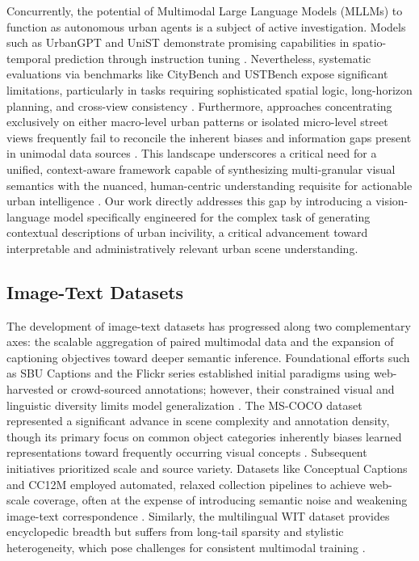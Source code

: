 \documentclass[lettersize,journal]{IEEEtran}
\begin{document}
	Concurrently, the potential of Multimodal Large Language Models (MLLMs) to function as autonomous urban agents is a subject of active investigation. Models such as UrbanGPT and UniST demonstrate promising capabilities in spatio-temporal prediction through instruction tuning \cite{li2024urbangpt, yuan2024unist}. Nevertheless, systematic evaluations via benchmarks like CityBench and USTBench expose significant limitations, particularly in tasks requiring sophisticated spatial logic, long-horizon planning, and cross-view consistency \cite{feng2024citybench, lai2025ustbench, zhou2025urbench}. Furthermore, approaches concentrating exclusively on either macro-level urban patterns or isolated micro-level street views frequently fail to reconcile the inherent biases and information gaps present in unimodal data sources \cite{chen2024profiling, hao2025urbanvlp}. This landscape underscores a critical need for a unified, context-aware framework capable of synthesizing multi-granular visual semantics with the nuanced, human-centric understanding requisite for actionable urban intelligence \cite{he2025urbanfeel}. Our work directly addresses this gap by introducing a vision-language model specifically engineered for the complex task of generating contextual descriptions of urban incivility, a critical advancement toward interpretable and administratively relevant urban scene understanding.
	
	\subsection{Image-Text Datasets}
	
	The development of image-text datasets has progressed along two complementary axes: the scalable aggregation of paired multimodal data and the expansion of captioning objectives toward deeper semantic inference. Foundational efforts such as SBU Captions and the Flickr series established initial paradigms using web-harvested or crowd-sourced annotations; however, their constrained visual and linguistic diversity limits model generalization \cite{ordonez2011im2text, hodosh2013framing, young2014image}. The MS-COCO dataset represented a significant advance in scene complexity and annotation density, though its primary focus on common object categories inherently biases learned representations toward frequently occurring visual concepts \cite{lin2014microsoft}. Subsequent initiatives prioritized scale and source variety. Datasets like Conceptual Captions and CC12M employed automated, relaxed collection pipelines to achieve web-scale coverage, often at the expense of introducing semantic noise and weakening image-text correspondence \cite{sharma2018conceptual, changpinyo2021conceptual}. Similarly, the multilingual WIT dataset provides encyclopedic breadth but suffers from long-tail sparsity and stylistic heterogeneity, which pose challenges for consistent multimodal training \cite{srinivasan2021wit}.
	
\end{document}

